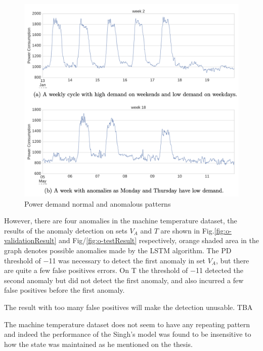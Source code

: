 \documentclass{article}
\begin{document}
\begin{figure}[htb]
	    \centering
\includegraphics[scale=0.45]{png/powerdemand.png}
    \caption{Power demand normal and anomalous patterns
\cite{7-lstmthisis} }
    \label{fig:powerdemand}
\end{figure}

However, there are four anomalies in the machine temperature dataset, the
results of the anomaly detection on sets $V_A$ and $T$ are shown in
Fig.\ref{fig:o-validationResult}
and Fig/\ref{fig:o-testResult} respectively, orange shaded area in the graph
denotes possible anomalies made by the LSTM algorithm. The PD threshold of −11
was necessary to detect the first anomaly in set $V_A$, but there are quite a
few false positives errors. On T the threshold of −11 detected the second
anomaly but did not detect the first anomaly, and also incurred a few false
positives before the first anomaly.

The result with too many false positives will make the detection unusable. TBA

The machine temperature dataset does not seem to have any repeating
pattern and indeed the performance of the Singh's model was found to be
insensitive to how the state was maintained as he mentioned on the thesis.
\end{document}
